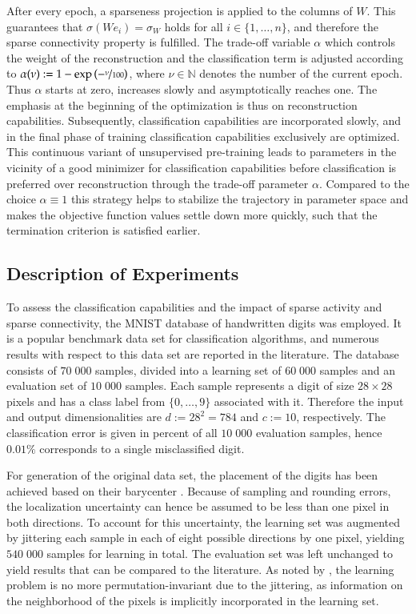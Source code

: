\documentclass[twoside,11pt]{article}
\newcommand{\N}{\mathbb{N}}
\newcommand{\0}{\mathcal{O}}
\newcommand{\discint}[2]{\{#1,\dotsc,#2\}}
\newcommand{\inint}[2]{\in\discint{#1}{#2}}
\begin{document}
After every epoch, a sparseness projection is applied to the columns of $W$.
This guarantees that $\sigma(We_i) = \sigma_W$ holds for all $i\inint{1}{n}$, and therefore the sparse connectivity property is fulfilled.
The trade-off variable $\alpha$ which controls the weight of the reconstruction and the classification term is adjusted according to $\alpha(\nu) := 1 - \exp\left(-\nicefrac{\nu}{100}\right)$, where $\nu\in\N$ denotes the number of the current epoch.
Thus $\alpha$ starts at zero, increases slowly and asymptotically reaches one.
The emphasis at the beginning of the optimization is thus on reconstruction capabilities.
Subsequently, classification capabilities are incorporated slowly, and in the final phase of training classification capabilities exclusively are optimized.
This continuous variant of unsupervised pre-training \citep{Hinton2006} leads to parameters in the vicinity of a good minimizer for classification capabilities before classification is preferred over reconstruction through the trade-off parameter $\alpha$.
Compared to the choice $\alpha\equiv 1$ this strategy helps to stabilize the trajectory in parameter space and makes the objective function values settle down more quickly, such that the termination criterion is satisfied earlier.

\subsection{Description of Experiments}
\label{sect:description_experiments}
To assess the classification capabilities and the impact of sparse activity and sparse connectivity, the MNIST database of handwritten digits \citep{MNIST} was employed.
It is a popular benchmark data set for classification algorithms, and numerous results with respect to this data set are reported in the literature.
The database consists of $70\;000$ samples, divided into a learning set of $60\;000$ samples and an evaluation set of $10\;000$ samples.
Each sample represents a digit of size $28\times 28$ pixels and has a class label from $\discint{0}{9}$ associated with it.
Therefore the input and output dimensionalities are $d := 28^2 = 784$ and $c := 10$, respectively.
The classification error is given in percent of all $10\;000$ evaluation samples, hence $0.01\%$ corresponds to a single misclassified digit.

For generation of the original data set, the placement of the digits has been achieved based on their barycenter \citep{MNIST}.
Because of sampling and rounding errors, the localization uncertainty can hence be assumed to be less than one pixel in both directions.
To account for this uncertainty, the learning set was augmented by jittering each sample in each of eight possible directions by one pixel, yielding $540\;000$ samples for learning in total.
The evaluation set was left unchanged to yield results that can be compared to the literature.
As noted by \citet{Hinton2006}, the learning problem is no more permutation-invariant due to the jittering, as information on the neighborhood of the pixels is implicitly incorporated in the learning set.
\end{document}
